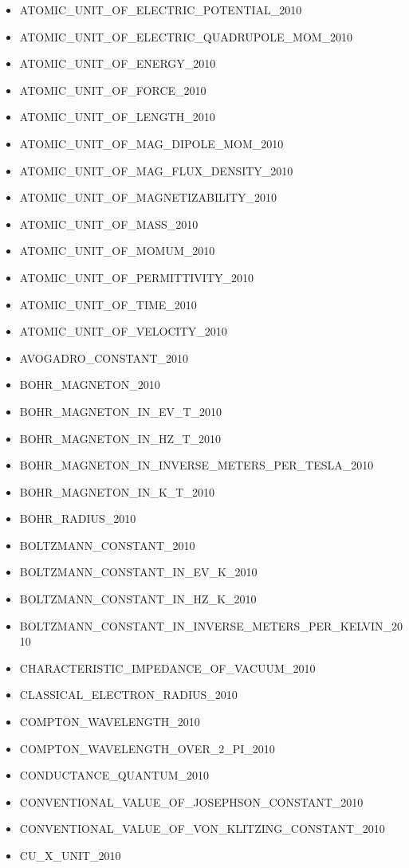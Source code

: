 \begin{itemize}
\item ATOMIC\_UNIT\_OF\_ELECTRIC\_POTENTIAL\_2010
\item ATOMIC\_UNIT\_OF\_ELECTRIC\_QUADRUPOLE\_MOM\_2010
\item ATOMIC\_UNIT\_OF\_ENERGY\_2010
\item ATOMIC\_UNIT\_OF\_FORCE\_2010
\item ATOMIC\_UNIT\_OF\_LENGTH\_2010
\item ATOMIC\_UNIT\_OF\_MAG\_DIPOLE\_MOM\_2010
\item ATOMIC\_UNIT\_OF\_MAG\_FLUX\_DENSITY\_2010
\item ATOMIC\_UNIT\_OF\_MAGNETIZABILITY\_2010
\item ATOMIC\_UNIT\_OF\_MASS\_2010
\item ATOMIC\_UNIT\_OF\_MOMUM\_2010
\item ATOMIC\_UNIT\_OF\_PERMITTIVITY\_2010
\item ATOMIC\_UNIT\_OF\_TIME\_2010
\item ATOMIC\_UNIT\_OF\_VELOCITY\_2010
\item AVOGADRO\_CONSTANT\_2010
\item BOHR\_MAGNETON\_2010
\item BOHR\_MAGNETON\_IN\_EV\_T\_2010
\item BOHR\_MAGNETON\_IN\_HZ\_T\_2010
\item BOHR\_MAGNETON\_IN\_INVERSE\_METERS\_PER\_TESLA\_2010
\item BOHR\_MAGNETON\_IN\_K\_T\_2010
\item BOHR\_RADIUS\_2010
\item BOLTZMANN\_CONSTANT\_2010
\item BOLTZMANN\_CONSTANT\_IN\_EV\_K\_2010
\item BOLTZMANN\_CONSTANT\_IN\_HZ\_K\_2010
\item BOLTZMANN\_CONSTANT\_IN\_INVERSE\_METERS\_PER\_KELVIN\_2010
\item CHARACTERISTIC\_IMPEDANCE\_OF\_VACUUM\_2010
\item CLASSICAL\_ELECTRON\_RADIUS\_2010
\item COMPTON\_WAVELENGTH\_2010
\item COMPTON\_WAVELENGTH\_OVER\_2\_PI\_2010
\item CONDUCTANCE\_QUANTUM\_2010
\item CONVENTIONAL\_VALUE\_OF\_JOSEPHSON\_CONSTANT\_2010
\item CONVENTIONAL\_VALUE\_OF\_VON\_KLITZING\_CONSTANT\_2010
\item CU\_X\_UNIT\_2010

\end{itemize}

